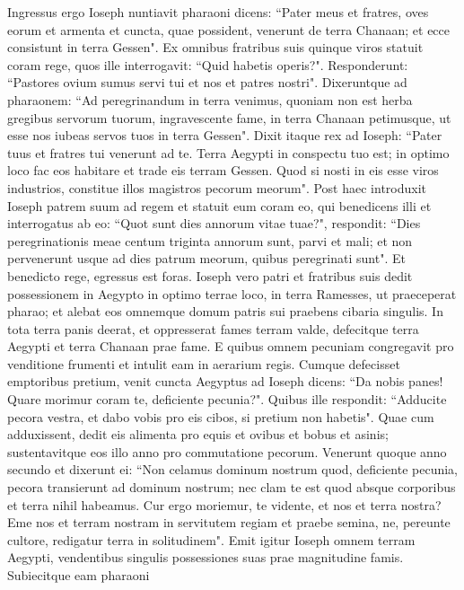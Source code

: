 \begin{biblechapter}  
\verse Ingressus ergo Ioseph nuntiavit pharaoni dicens: “Pater meus et fratres, oves eorum et armenta et cuncta, quae possident, venerunt de terra Chanaan; et ecce consistunt in terra Gessen". 
\verse Ex omnibus fratribus suis quinque viros statuit coram rege, 
\verse quos ille interrogavit: “Quid habetis operis?". Responderunt: “Pastores ovium sumus servi tui et nos et patres nostri". 
\verse Dixeruntque ad pharaonem: “Ad peregrinandum in terra venimus, quoniam non est herba gregibus servorum tuorum, ingravescente fame, in terra Chanaan petimusque, ut esse nos iubeas servos tuos in terra Gessen". 
\verse Dixit itaque rex ad Ioseph: “Pater tuus et fratres tui venerunt ad te. 
\verse Terra Aegypti in conspectu tuo est; in optimo loco fac eos habitare et trade eis terram Gessen. Quod si nosti in eis esse viros industrios, constitue illos magistros pecorum meorum". 
\verse Post haec introduxit Ioseph patrem suum ad regem et statuit eum coram eo, qui benedicens illi 
\verse et interrogatus ab eo: “Quot sunt dies annorum vitae tuae?", 
\verse respondit: “Dies peregrinationis meae centum triginta annorum sunt, parvi et mali; et non pervenerunt usque ad dies patrum meorum, quibus peregrinati sunt". 
\verse Et benedicto rege, egressus est foras. 
\verse Ioseph vero patri et fratribus suis dedit possessionem in Aegypto in optimo terrae loco, in terra Ramesses, ut praeceperat pharao; 
\verse et alebat eos omnemque domum patris sui praebens cibaria singulis. 
\verse In tota terra panis deerat, et oppresserat fames terram valde, defecitque terra Aegypti et terra Chanaan prae fame. 
\verse E quibus omnem pecuniam congregavit pro venditione frumenti et intulit eam in aerarium regis. 
\verse Cumque defecisset emptoribus pretium, venit cuncta Aegyptus ad Ioseph dicens: “Da nobis panes! Quare morimur coram te, deficiente pecunia?". 
\verse Quibus ille respondit: “Adducite pecora vestra, et dabo vobis pro eis cibos, si pretium non habetis". 
\verse Quae cum adduxissent, dedit eis alimenta pro equis et ovibus et bobus et asinis; sustentavitque eos illo anno pro commutatione pecorum. 
\verse Venerunt quoque anno secundo et dixerunt ei: “Non celamus dominum nostrum quod, deficiente pecunia, pecora transierunt ad dominum nostrum; nec clam te est quod absque corporibus et terra nihil habeamus. 
\verse Cur ergo moriemur, te vidente, et nos et terra nostra? Eme nos et terram nostram in servitutem regiam et praebe semina, ne, pereunte cultore, redigatur terra in solitudinem". 
\verse Emit igitur Ioseph omnem terram Aegypti, vendentibus singulis possessiones suas prae magnitudine famis. Subiecitque eam pharaoni 

\end{biblechapter}
